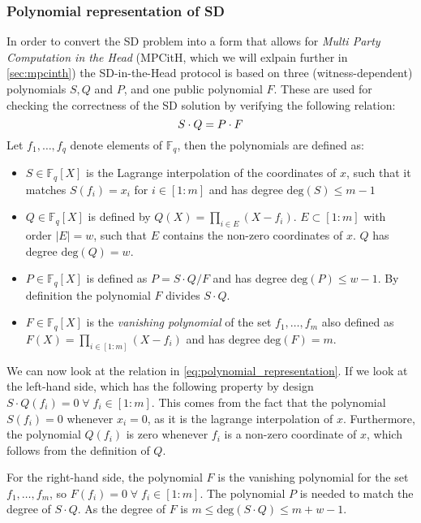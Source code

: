 \documentclass[twoside,11pt,openright]{report}
\theoremstyle{definition}
\theoremstyle{plain}
\begin{document}
\subsubsection{Polynomial representation of SD}\label{sec:polynomial_representation}
In order to convert the SD problem into a form that allows for \textit{Multi Party Computation in the Head} (MPCitH, which we will exlpain further in \autoref{sec:mpcinth}) the SD-in-the-Head protocol is based on three (witness-dependent) polynomials $S, Q$ and $P$, and one public polynomial $F$.
These are used for checking the correctness of the SD solution by verifying the following relation:
\begin{equation}
  \centering
  S\cdot Q = P\cdot F
  \label{eq:polynomial_representation}
\end{equation}
Let $f_1,\dots, f_q$ denote elements of $\mathbb{F}_q$, then the polynomials are defined as:
\begin{itemize}
  \item $S\in \mathbb{F}_q[X]$ is the Lagrange interpolation of the coordinates of $x$, such that it matches $S(f_i) = x_i$ for $i\in [1:m]$ and has degree $\text{deg}(S) \leq m-1$
  \item $Q\in \mathbb{F}_q[X]$ is defined by $Q(X) = \prod_{i\in E}(X - f_i)$. $E \subset [1:m]$ with order $|E| = w$, such that $E$ contains the non-zero coordinates of $x$. $Q$ has degree $\text{deg}(Q) = w$.
  \item $P\in \mathbb{F}_q[X]$ is defined as $P = S\cdot Q/F$ and has degree $\text{deg}(P) \leq w-1$. By definition the polynomial $F$ divides $S\cdot Q$.
  \item $F\in \mathbb{F}_q[X]$ is the \textit{vanishing polynomial} of the set ${f_1, \dots, f_m}$ also defined as $F(X) = \prod_{i\in [1:m]}(X - f_i)$ and has degree $\text{deg}(F) = m$.
\end{itemize}
We can now look at the relation in \autoref{eq:polynomial_representation}. If we look at the left-hand side, which has the following property by design $S\cdot Q(f_i) = 0 \;\forall\; f_i \in [1:m]$. This comes from the fact that the polynomial $S(f_i) = 0$ whenever $x_i = 0$, as it is the lagrange interpolation of $x$. Furthermore, the polynomial $Q(f_i)$ is zero whenever $f_i$ is a non-zero coordinate of $x$, which follows from the definition of $Q$.

For the right-hand side, the polynomial $F$ is the vanishing polynomial for the set ${f_1, \dots, f_m}$, so $F(f_i) = 0 \;\forall\; f_i \in [1:m]$. The polynomial $P$ is needed to match the degree of $S \cdot Q$. As the degree of $F$ is $m \leq \text{deg}(S\cdot Q) \leq m + w - 1$.
\end{document}
